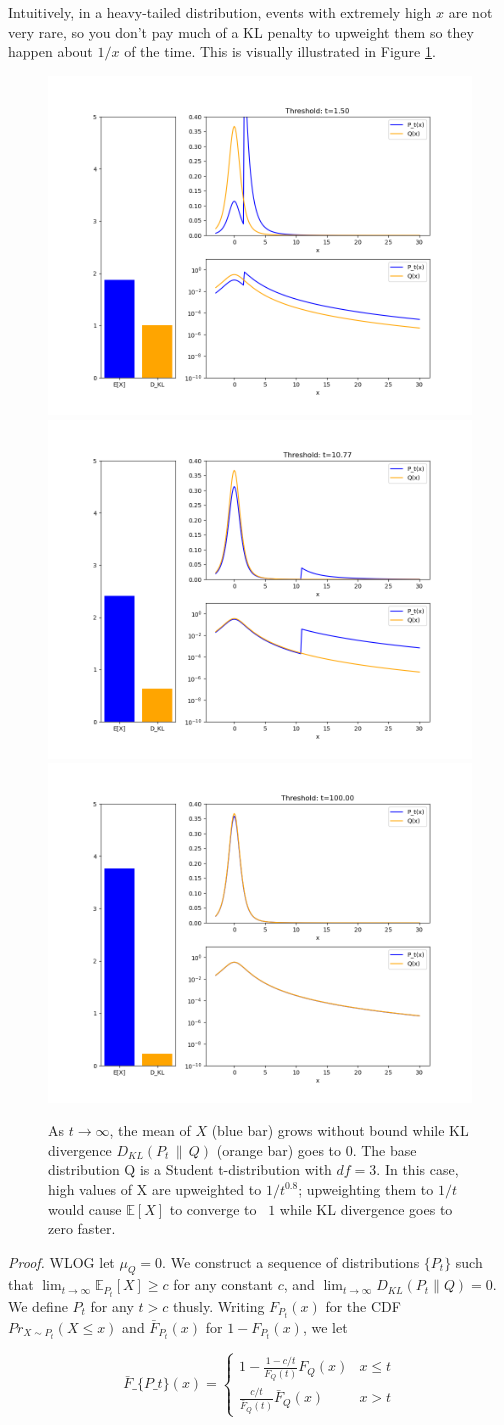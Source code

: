 \documentclass{article}
\theoremstyle{plain}
\theoremstyle{definition}
\theoremstyle{remark}
\begin{document}
Intuitively, in a heavy-tailed distribution, events with extremely high $x$ are not very rare, so you don’t pay much of a KL penalty to upweight them so they happen about $1/x$ of the time. This is visually illustrated in Figure \ref{fig1}.

\begin{figure}
    \label{fig1}
    \centering
    \includegraphics[width=0.3\linewidth]{goodhart_kl_001.png}
    \includegraphics[width=0.3\linewidth]{goodhart_kl_024.png}
    \includegraphics[width=0.3\linewidth]{goodhart_kl_050.png}
    \caption{As $t \to \infty$, the mean of $X$ (blue bar) grows without bound while KL divergence $D_{KL}(P_t \,\|\, Q)$ (orange bar) goes to 0. The base distribution Q is a Student t-distribution with $df=3$. In this case, high values of X are upweighted to $1/t^{0.8}$; upweighting them to $1/t$ would cause $\mathbb E[X]$ to converge to ~$1$ while KL divergence goes to zero faster.}
\end{figure}

\emph{Proof.} WLOG let \(\mu_Q = 0\). We construct a sequence of
distributions \(\{P_t\}\) such that
\(\lim_{t \to \infty} \mathbb E_{P_t}[X] \ge c\) for any constant \(c\),
and \(\lim_{t \to \infty} D_{KL}(P_t \| Q) = 0\). We define \(P_t\) for
any \(t > c\) thusly. Writing \(F_{P_t}(x)\) for the CDF
\(Pr_{X \sim P_t}(X \le x)\) and \(\bar F_{P_t}(x)\) for
\(1 - F_{P_t}(x)\), we let

$$ \bar F\_\{P\_t\}(x) =
\begin{cases} 1 - \frac{1 - c/t}{F_Q(t)}F_Q(x) & x \le t
\\ \frac{c/t}{\bar F_Q(t)}\bar F_Q(x) & x > t
\end{cases}
$$
\end{document}
